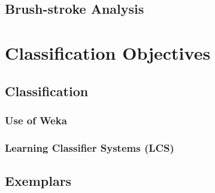 \subsection{Brush-stroke Analysis}


\section{Classification Objectives}

\subsection{Classification}

\subsubsection{Use of Weka}

\subsubsection{Learning Classifier Systems (LCS)}

\subsection{Exemplars}



